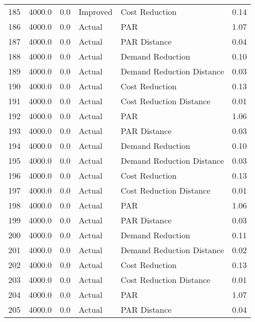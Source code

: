 \begin{longtable}{lrrllr}
185  &       4000.0 &     0.0 &       Improved &             Cost Reduction &   0.14 \\
186  &       4000.0 &     0.0 &         Actual &                        PAR &   1.07 \\
187  &       4000.0 &     0.0 &         Actual &               PAR Distance &   0.04 \\
188  &       4000.0 &     0.0 &         Actual &           Demand Reduction &   0.10 \\
189  &       4000.0 &     0.0 &         Actual &  Demand Reduction Distance &   0.03 \\
190  &       4000.0 &     0.0 &         Actual &             Cost Reduction &   0.13 \\
191  &       4000.0 &     0.0 &         Actual &    Cost Reduction Distance &   0.01 \\
192  &       4000.0 &     0.0 &         Actual &                        PAR &   1.06 \\
193  &       4000.0 &     0.0 &         Actual &               PAR Distance &   0.03 \\
194  &       4000.0 &     0.0 &         Actual &           Demand Reduction &   0.10 \\
195  &       4000.0 &     0.0 &         Actual &  Demand Reduction Distance &   0.03 \\
196  &       4000.0 &     0.0 &         Actual &             Cost Reduction &   0.13 \\
197  &       4000.0 &     0.0 &         Actual &    Cost Reduction Distance &   0.01 \\
198  &       4000.0 &     0.0 &         Actual &                        PAR &   1.06 \\
199  &       4000.0 &     0.0 &         Actual &               PAR Distance &   0.03 \\
200  &       4000.0 &     0.0 &         Actual &           Demand Reduction &   0.11 \\
201  &       4000.0 &     0.0 &         Actual &  Demand Reduction Distance &   0.02 \\
202  &       4000.0 &     0.0 &         Actual &             Cost Reduction &   0.13 \\
203  &       4000.0 &     0.0 &         Actual &    Cost Reduction Distance &   0.01 \\
204  &       4000.0 &     0.0 &         Actual &                        PAR &   1.07 \\
205  &       4000.0 &     0.0 &         Actual &               PAR Distance &   0.04 \\

\end{longtable}
